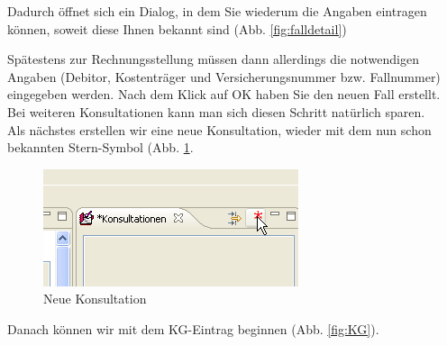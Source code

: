 Dadurch öffnet sich ein Dialog, in dem Sie wiederum die Angaben eintragen
können, soweit diese Ihnen bekannt sind (Abb. \ref{fig:falldetail})

Spätestens zur Rechnungsstellung müssen dann allerdings die notwendigen Angaben (Debitor, Kostenträger und Versicherungsnummer bzw. Fallnummer)
eingegeben werden.
Nach dem Klick auf OK haben Sie den neuen Fall erstellt. Bei weiteren
Konsultationen kann man sich diesen Schritt natürlich sparen.\\
\bigskip
Als nächstes erstellen wir eine neue Konsultation, wieder mit dem nun schon
bekannten Stern-Symbol (Abb. \ref{fig:neuekons}.
\begin{figure}[ht]
	\includegraphics{images/einf5}
	\caption{Neue Konsultation}
	\label{fig:neuekons}
\end{figure}
\pagebreak[2]
Danach können wir mit dem KG-Eintrag beginnen (Abb. \ref{fig:KG}).
